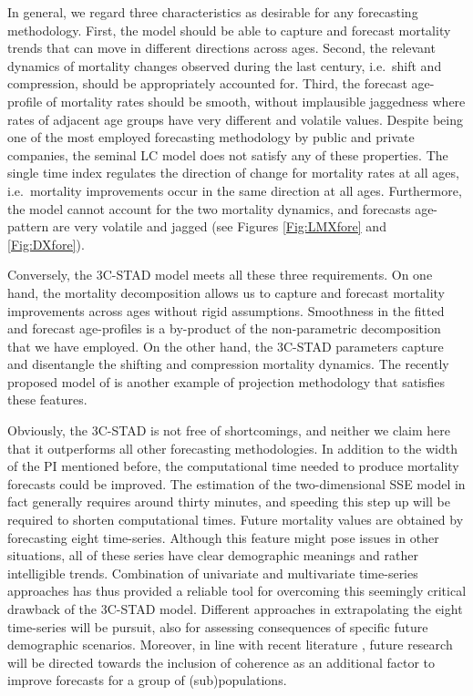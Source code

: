 \documentclass[11pt, a4paper]{article}
\begin{document}
In general, we regard three characteristics as desirable for any forecasting methodology. First, the model should be able to capture and forecast mortality trends that can move in different directions across ages. Second, the relevant dynamics of mortality changes observed during the last century, i.e.~shift and compression, should be appropriately accounted for. Third, the forecast age-profile of mortality rates should be smooth, without implausible jaggedness where rates of adjacent age groups have very different and volatile values. Despite being one of the most employed forecasting methodology by public and private companies, the seminal LC model does not satisfy any of these properties. The single time index regulates the direction of change for mortality rates at all ages, i.e.~mortality improvements occur in the same direction at all ages. Furthermore, the model cannot account for the two mortality dynamics, and forecasts age-pattern are very volatile and jagged (see Figures \ref{Fig:LMXfore} and \ref{Fig:DXfore}).
 
Conversely, the 3C-STAD model meets all these three requirements. On one hand, the mortality decomposition allows us to capture and forecast mortality improvements across ages without rigid assumptions. Smoothness in the fitted and forecast age-profiles is a by-product of the non-parametric decomposition that we have employed. On the other hand, the 3C-STAD parameters capture and disentangle the shifting and compression mortality dynamics. The recently proposed model of \cite{bardoutsos2018projecting} is another example of projection methodology that satisfies these features.

Obviously, the 3C-STAD is not free of shortcomings, and neither we claim here that it outperforms all other forecasting methodologies. In addition to the width of the PI mentioned before, the computational time needed to produce mortality forecasts could be improved. The estimation of the two-dimensional SSE model in fact generally requires around thirty minutes, and speeding this step up will be required to shorten computational times. Future mortality values are obtained by forecasting eight time-series. Although this feature might pose issues in other situations, all of these series have clear demographic meanings and rather intelligible trends. Combination of univariate and multivariate time-series approaches has thus provided a reliable tool for overcoming this seemingly critical drawback of the 3C-STAD model. Different approaches in extrapolating the eight time-series will be pursuit, also for assessing consequences of specific future demographic scenarios. Moreover, in line with recent literature \citep{li2005coherent,hyndman2013coherent,janssen2013smoking,bergeron2017coherent}, future research will be directed towards the inclusion of coherence as an additional factor to improve forecasts for a group of (sub)populations.    
\end{document}
